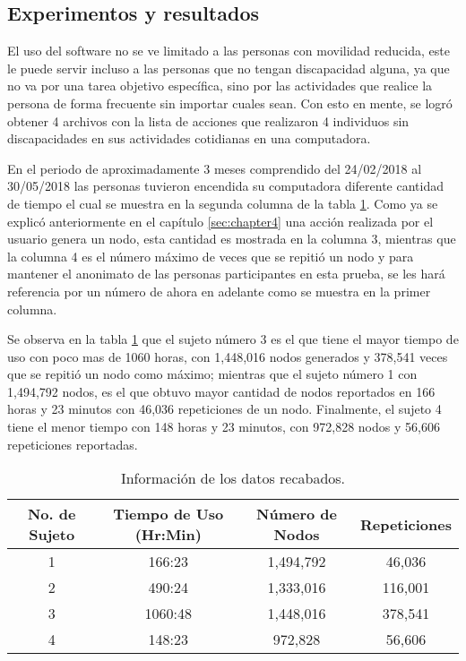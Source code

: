 \subsection{Experimentos y resultados}

El uso del software no se ve limitado a las personas con movilidad reducida,
 este le puede servir incluso a las personas que no tengan discapacidad 
 alguna, ya que no va por una tarea objetivo espec\'ifica, sino por las 
 actividades que realice la persona de forma frecuente sin importar cuales 
 sean. Con esto en mente, se logr\'o obtener 4 archivos con la lista de 
 acciones que realizaron 4 individuos sin discapacidades en sus actividades 
 cotidianas en una computadora.


En el periodo de aproximadamente 3 meses comprendido del 24/02/2018 al 
 30/05/2018 las personas tuvieron encendida su computadora diferente cantidad 
 de tiempo el cual se muestra en la segunda columna de la tabla 
 \ref{infodata}. Como ya se explic\'o anteriormente en el cap\'itulo 
 \ref{sec:chapter4} una acci\'on realizada por el usuario genera un nodo, esta 
 cantidad es mostrada en la columna 3, mientras que la columna 4 es el 
 n\'umero m\'aximo de veces que se repiti\'o un nodo y para mantener el 
 anonimato de las personas participantes en esta prueba, se les har\'a 
 referencia por un n\'umero de ahora en adelante como se muestra en la primer 
 columna. 

Se observa en la tabla \ref{infodata} que el sujeto n\'umero 3 es el que tiene 
 el mayor tiempo de uso con poco mas de 1060 horas, con 1,448,016 nodos 
 generados y 378,541 veces que se repiti\'o un nodo como m\'aximo; mientras 
 que el sujeto n\'umero 1 con 1,494,792 nodos, es el que obtuvo mayor cantidad 
 de nodos reportados en 166 horas y 23 minutos con 46,036 repeticiones de un 
 nodo. Finalmente, el sujeto 4 tiene el menor tiempo con 148 horas y 23 
 minutos, con 972,828 nodos y 56,606 repeticiones reportadas.


\begin{table}[]
\centering
\begin{tabular}{cccc}
\hline
No. de Sujeto	
&   Tiempo de Uso (Hr:Min)		
&	N\'umero de Nodos	
&   Repeticiones 	\\   
\hline

1				
&	166:23 						
&	1,494,792			
&	46,036				\\
		
2
&	490:24
&	1,333,016
&	116,001				\\
		
3
&	1060:48
&	1,448,016
&	378,541				\\
		
4
&	148:23
&	972,828
&	56,606				\\ 
\hline

\end{tabular}
\caption{Informaci\'on de los datos recabados.}
\label{infodata}
\end{table}

